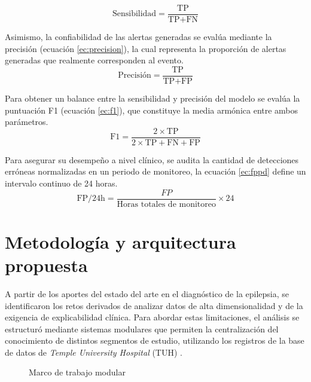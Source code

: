 \begin{equation}
    \text{Sensibilidad} = \frac{\text{TP}}{\text{TP} + \text{FN}}
    \label{ec:sensibilidad}
\end{equation}

Asimismo, la confiabilidad de las alertas generadas se evalúa mediante la precisión (ecuación \ref{ec:precision}), la cual representa la proporción de alertas generadas que realmente corresponden al evento.
\begin{equation}
    \text{Precisión} = \frac{\text{TP}}{\text{TP}+\text{FP}}
    \label{ec:precision}
\end{equation}

Para obtener un balance entre la sensibilidad y precisión del modelo se evalúa la puntuación F1 (ecuación \ref{ec:f1}), que constituye la media armónica entre ambos parámetros.
\begin{equation}
    \text{F1} = \frac{2\times \text{TP}}{2\times \text{TP}+\text{FN}+\text{FP}}
    \label{ec:f1}
\end{equation}

Para asegurar su desempeño a nivel clínico, se audita la cantidad de detecciones erróneas normalizadas en un periodo de monitoreo, la ecuación \ref{ec:fppd} define un intervalo continuo de 24 horas.
\begin{equation}
    \text{FP/24h} = \frac{FP}{\text{Horas totales de monitoreo}}\times 24
    \label{ec:fppd}
\end{equation}

\chapter{Metodología y arquitectura propuesta}
A partir de los aportes del estado del arte en el diagnóstico de la epilepsia, se identificaron los retos derivados de analizar datos de alta dimensionalidad y de la exigencia de explicabilidad clínica. Para abordar estas limitaciones, el análisis se estructuró mediante sistemas modulares que permiten la centralización del conocimiento de distintos segmentos de estudio, utilizando los registros de la base de datos de \textit{Temple University Hospital} (TUH) \cite{obeid2016temple}. 

\begin{figure}[h] 
    \centering\captionsetup{width=0.8\linewidth}
    \caption{Marco de trabajo modular}
    
    \label{fig:framework}   
\end{figure}

